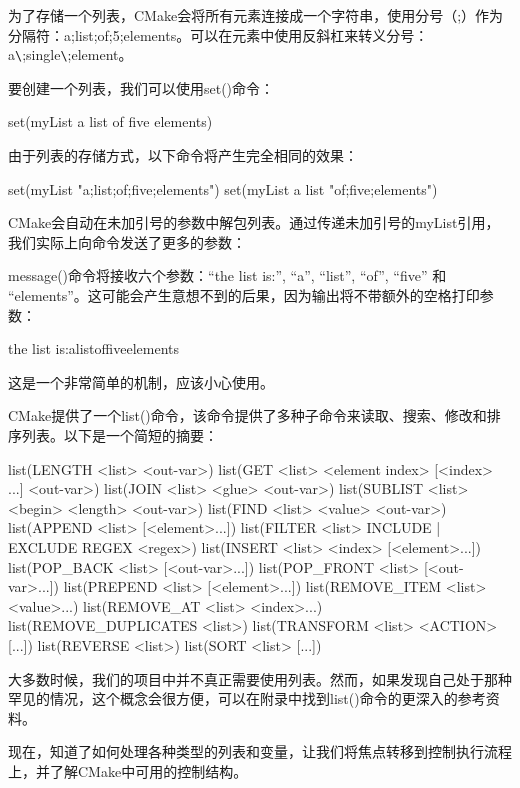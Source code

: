 
为了存储一个列表，CMake会将所有元素连接成一个字符串，使用分号（;）作为分隔符：a;list;of;5;elements。可以在元素中使用反斜杠来转义分号：a\verb|\|;single\verb|\|;element。


要创建一个列表，我们可以使用set()命令：

\begin{cmake}
set(myList a list of five elements)
\end{cmake}

由于列表的存储方式，以下命令将产生完全相同的效果：

\begin{cmake}
set(myList "a;list;of;five;elements")
set(myList a list "of;five;elements")
\end{cmake}

CMake会自动在未加引号的参数中解包列表。通过传递未加引号的myList引用，我们实际上向命令发送了更多的参数：


message()命令将接收六个参数：“the list is:”, “a”, “list”, “of”, “five” 和 “elements”。这可能会产生意想不到的后果，因为输出将不带额外的空格打印参数：

\begin{shell}
the list is:alistoffiveelements
\end{shell}

这是一个非常简单的机制，应该小心使用。

CMake提供了一个list()命令，该命令提供了多种子命令来读取、搜索、修改和排序列表。以下是一个简短的摘要：

\begin{cmake}
list(LENGTH <list> <out-var>)
list(GET <list> <element index> [<index> ...] <out-var>)
list(JOIN <list> <glue> <out-var>)
list(SUBLIST <list> <begin> <length> <out-var>)
list(FIND <list> <value> <out-var>)
list(APPEND <list> [<element>...])
list(FILTER <list> {INCLUDE | EXCLUDE} REGEX <regex>)
list(INSERT <list> <index> [<element>...])
list(POP_BACK <list> [<out-var>...])
list(POP_FRONT <list> [<out-var>...])
list(PREPEND <list> [<element>...])
list(REMOVE_ITEM <list> <value>...)
list(REMOVE_AT <list> <index>...)
list(REMOVE_DUPLICATES <list>)
list(TRANSFORM <list> <ACTION> [...])
list(REVERSE <list>)
list(SORT <list> [...])
\end{cmake}

大多数时候，我们的项目中并不真正需要使用列表。然而，如果发现自己处于那种罕见的情况，这个概念会很方便，可以在附录中找到list()命令的更深入的参考资料。

现在，知道了如何处理各种类型的列表和变量，让我们将焦点转移到控制执行流程上，并了解CMake中可用的控制结构。
















